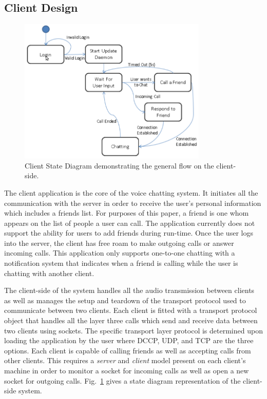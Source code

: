 \documentclass[letterpaper, 9 pt, balance, conference]{ieeeconf}
\begin{document}
\subsection{Client Design}
\label{subsec:client_des}

\begin{figure}[!t]
   \centering
      \includegraphics[width=0.8\textwidth]{pics/Client_StateDiagram}
   \caption{Client State Diagram demonstrating the general flow on the client-side.}
\label{fig:client_state_diag}
\end{figure}

The client application is the core of the voice chatting system.  It initiates all
the communication with the server in order to receive the user's personal 
information which includes a friends list. For purposes of this paper, a friend
is one whom appears on the list of people a user can call. The application currently
does not support the ability for users to add friends during run-time.  Once the 
user logs into the server,
the client has free roam to make outgoing calls or answer incoming calls.  This
application only supports one-to-one chatting with a notification system that 
indicates when a friend is calling while the user is chatting with another client.  

The client-side of the system handles all the audio transmission between clients
as well as manages the setup and teardown of the transport protocol used to
communicate between two clients.  Each client is fitted with a transport protocol
object that handles all the layer three calls which send and receive data between
two clients using sockets.  The specific transport layer protocol is determined
upon loading the application by the user where DCCP, UDP, and TCP are the three
options. Each client is capable of calling friends as well as accepting calls from
other clients.  This requires a \textit{server} and \textit{client} model present
on each client's machine in order to monitor a socket for incoming calls as well
as open a new socket for outgoing calls.  Fig.~\ref{fig:client_state_diag} gives 
a state diagram representation of the client-side system.
\end{document}
